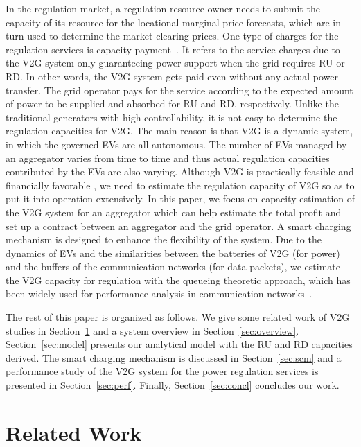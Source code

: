 \documentclass[journal]{IEEEtran}
\begin{document}
In the regulation market, a regulation resource owner needs to submit the capacity of its resource for the locational marginal price forecasts, which are in turn used to determine the market clearing prices.
One type of charges for the regulation services is capacity
payment~\cite{V2G_fundamentals}.  It refers to the service
charges due to the V2G system only guaranteeing power support when the grid
requires RU or RD.  In other words, the V2G system gets paid even
without any actual power transfer.  The grid operator pays for the service
according to the expected amount of power to be supplied and absorbed for
RU and RD, respectively.  
Unlike the traditional generators with high controllability, it is not easy to determine the regulation capacities for V2G. The main reason is that V2G is a dynamic system, in which the governed EVs are all autonomous. The number of EVs managed by an aggregator varies from time to time and thus actual regulation capacities contributed by the EVs are also varying. Although V2G is practically feasible \cite{delaware} and financially favorable \cite{financialreturn}, we need to estimate the regulation capacity of V2G so as to put it into operation extensively.
In this paper, we focus on capacity estimation of the V2G system for an aggregator which can help estimate the
total profit and set up a contract between an aggregator and the grid
operator. 
A smart charging mechanism is designed to enhance the flexibility of the system.
 Due to the dynamics of EVs and the similarities between the
batteries of V2G (for power) and the buffers of the communication networks
(for data packets), we estimate the V2G capacity for regulation with the
queueing theoretic approach, which has been widely used for performance
analysis in communication networks~\cite{networkqueueing}.

The rest of this paper is organized as follows.  We give some related work of
 V2G studies in Section~\ref{sec:related} and a system overview in
Section~\ref{sec:overview}.  Section~\ref{sec:model} presents our analytical
model with the RU and RD capacities derived. The smart charging mechanism is discussed in Section~\ref{sec:scm} and
a performance study of the V2G system for the power regulation
services is presented in Section~\ref{sec:perf}.  Finally,
Section~\ref{sec:concl} concludes our work.


\section{Related Work} \label{sec:related}
\end{document}

